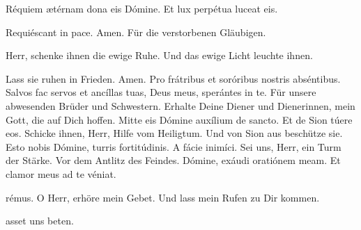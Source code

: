 \documentclass[fontsize=10pt,paper=A5,twoside,BCOR=1mm,DIV=21,headinclude]{scrarticle}
\begin{document}
\begin{paracol}{2}
\V Réquiem ætérnam dona eis Dómine.
\R Et lux perpétua luceat eis.

\V Requiéscant in pace.
\R Amen.
	\switchcolumn 
	\V Für die verstorbenen Gläubigen.

	\V Herr, schenke ihnen die ewige Ruhe.
	\R Und das ewige Licht leuchte ihnen.

	\V Lass sie ruhen in Frieden.
	\R Amen.
\switchcolumn* 
\V Pro frátribus et soróribus nostris abséntibus.
\R Salvos fac servos et ancíllas tuas, Deus meus, sperántes in te.
	\switchcolumn 
	\V Für unsere abwesenden Brüder und Schwestern.
	\R Erhalte Deine Diener und Dienerinnen, mein Gott, die auf Dich hoffen.
\switchcolumn*
\V Mitte eis Dómine auxílium de sancto.
\R Et de Sion túere eos.
	\switchcolumn 
	\V Schicke ihnen, Herr, Hilfe vom Heiligtum.
	\R Und von Sion aus beschütze sie.
\switchcolumn*
\V Esto nobis Dómine, turris fortitúdinis.
\R A fácie inimíci.
	\switchcolumn 
	\V Sei uns, Herr, ein Turm der Stärke. 
	\R Vor dem Antlitz des Feindes.
\switchcolumn*
\V Dómine, exáudi oratiónem meam.
\R Et clamor meus ad te véniat.

\hfill{}rémus.\hfill\null
\switchcolumn
	\V O Herr, erhöre mein Gebet.
	\R Und lass mein Rufen zu Dir kommen.

	\hfill{}asset uns beten.\hfill\null
\end{paracol}


\vspace{.3em}
\end{document}
